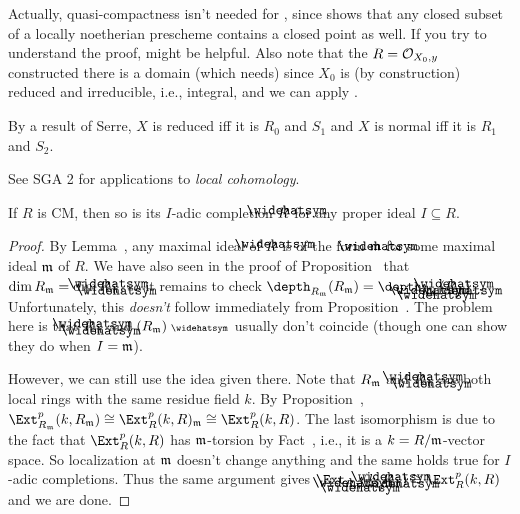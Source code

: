 \documentclass[a4paper,parskip=half,numbers=enddot, DIV=12]{scrreprt}
\begin{document}
\begin{rem*}
	Actually, quasi-compactness isn't needed for , since \cite[]{stacks-project} shows that any closed subset of a locally noetherian prescheme contains a closed point as well. If you try to understand the proof, \cite[Proposition~2.1.3]{alggeo1} might be helpful. Also note that the $R=\mathcal{O}_{X_0,y}$ constructed there is a domain (which \cite[]{stacks-project} needs) since $X_0$ is (by construction) reduced and irreducible, i.e., integral, and we can apply \cite[Proposition~2.1.4]{alggeo1}.
\end{rem*}
\begin{rem*}
	\begin{alphanumerate}
		\item By a result of Serre, $X$ is reduced iff it is $R_0$ and $S_1$ and $X$ is normal iff it is $R_1$ and $S_2$.
		\item See SGA 2 for applications to \emph{local cohomology}.
	\end{alphanumerate}
\end{rem*}
\begin{prop}
	If $R$ is CM, then so is its $I$-adic completion $\roof{R}$ for any proper ideal $I\subseteq R$.
\end{prop}
\begin{proof}
	By Lemma~, any maximal ideal of $\roof{R}$ is of the form $\roof{\mm}$ for some maximal ideal $\mathfrak{m}$ of $R$. We have also seen in the proof of Proposition~ that $\dim R_\mm=\dim \roof{R}_{\roof{\mm}}$, so it remains to check $\depth_{R_\mm}(R_\mm)=\depth_{\roof{R}_{\roof{\mm}}}(\roof{R}_{\roof{\mm}})$. Unfortunately, this \emph{doesn't} follow immediately from Proposition~. The problem here is that $\roof{R}_{\roof{\mm}}$ and $(R_\mm)^\complete $ usually don't coincide (though one can show they do when $I=\mathfrak{m}$).
	
	However, we can still use the idea given there. Note that $R_{\mathfrak{m}}$ and $\roof{R}_{\roof{\mm}}$ are both local rings with the same residue field $k$. By Proposition~, $\Ext_{R_\mm}^p(k,R_\mm)\cong \Ext_R^p(k,R)_\mm\cong\Ext_R^p(k,R)$. The last isomorphism is due to the fact that $\Ext_R^p(k,R)$ has $\mathfrak{m}$-torsion by Fact~, i.e., it is a $k=R/\mathfrak{m}$-vector space. So localization at $\mathfrak{m}$ doesn't change anything and the same holds true for $I$-adic completions. Thus the same argument gives $\Ext_{\roof{R}_{\roof{\mm}}}(k,\roof{R}_{\roof{\mm}})\cong \Ext_R^p(k,R)$ and we are done.
\end{proof}
\end{document}
